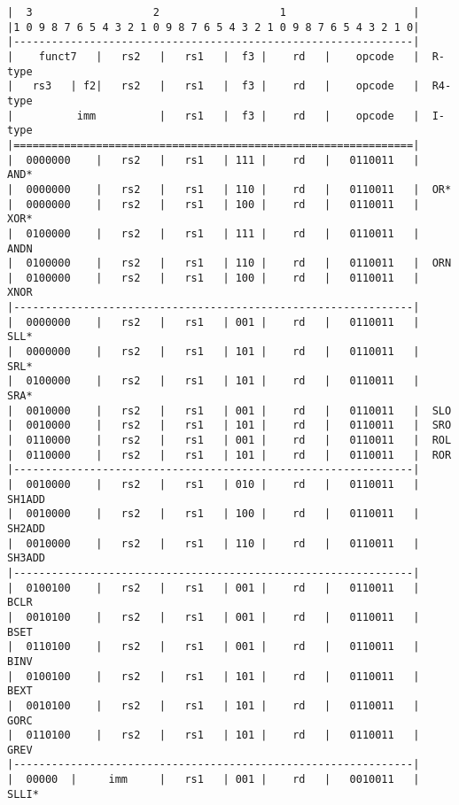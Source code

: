 
\begin{minipage}{\linewidth}
\begin{verbatim}
|  3                   2                   1                    |
|1 0 9 8 7 6 5 4 3 2 1 0 9 8 7 6 5 4 3 2 1 0 9 8 7 6 5 4 3 2 1 0|
|---------------------------------------------------------------|
|    funct7   |   rs2   |   rs1   |  f3 |    rd   |    opcode   |  R-type
|   rs3   | f2|   rs2   |   rs1   |  f3 |    rd   |    opcode   |  R4-type
|          imm          |   rs1   |  f3 |    rd   |    opcode   |  I-type
|===============================================================|
|  0000000    |   rs2   |   rs1   | 111 |    rd   |   0110011   |  AND*
|  0000000    |   rs2   |   rs1   | 110 |    rd   |   0110011   |  OR*
|  0000000    |   rs2   |   rs1   | 100 |    rd   |   0110011   |  XOR*
|  0100000    |   rs2   |   rs1   | 111 |    rd   |   0110011   |  ANDN
|  0100000    |   rs2   |   rs1   | 110 |    rd   |   0110011   |  ORN
|  0100000    |   rs2   |   rs1   | 100 |    rd   |   0110011   |  XNOR
|---------------------------------------------------------------|
|  0000000    |   rs2   |   rs1   | 001 |    rd   |   0110011   |  SLL*
|  0000000    |   rs2   |   rs1   | 101 |    rd   |   0110011   |  SRL*
|  0100000    |   rs2   |   rs1   | 101 |    rd   |   0110011   |  SRA*
|  0010000    |   rs2   |   rs1   | 001 |    rd   |   0110011   |  SLO
|  0010000    |   rs2   |   rs1   | 101 |    rd   |   0110011   |  SRO
|  0110000    |   rs2   |   rs1   | 001 |    rd   |   0110011   |  ROL
|  0110000    |   rs2   |   rs1   | 101 |    rd   |   0110011   |  ROR
|---------------------------------------------------------------|
|  0010000    |   rs2   |   rs1   | 010 |    rd   |   0110011   |  SH1ADD
|  0010000    |   rs2   |   rs1   | 100 |    rd   |   0110011   |  SH2ADD
|  0010000    |   rs2   |   rs1   | 110 |    rd   |   0110011   |  SH3ADD
|---------------------------------------------------------------|
|  0100100    |   rs2   |   rs1   | 001 |    rd   |   0110011   |  BCLR
|  0010100    |   rs2   |   rs1   | 001 |    rd   |   0110011   |  BSET
|  0110100    |   rs2   |   rs1   | 001 |    rd   |   0110011   |  BINV
|  0100100    |   rs2   |   rs1   | 101 |    rd   |   0110011   |  BEXT
|  0010100    |   rs2   |   rs1   | 101 |    rd   |   0110011   |  GORC
|  0110100    |   rs2   |   rs1   | 101 |    rd   |   0110011   |  GREV
|---------------------------------------------------------------|
|  00000  |     imm     |   rs1   | 001 |    rd   |   0010011   |  SLLI*

\end{verbatim}
\end{minipage}

